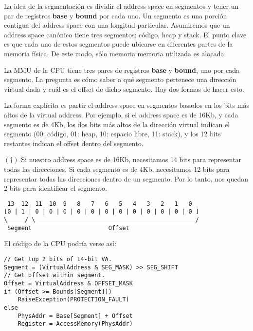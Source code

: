 \documentclass[12pt]{article}
\theoremstyle{definition}
\begin{document}
La idea de la segmentación es dividir el address space en segmentos y tener un
par de registros \textbf{base} y \textbf{bound} por cada uno. Un segmento es una
porción contigua del address space con una longitud particular. Asumiremos que
un address space canónico tiene tres segmentos: código, heap y stack.  El punto
clave es que cada uno de estos segmentos puede ubicarse en diferentes partes de
la memoria física.  De este modo, sólo memoria memoria utilizada es alocada. 

La MMU de la CPU tiene tres pares de registros \textbf{base} y \textbf{bound},
uno por cada segmento. La pregunta es cómo saber a qué segmento pertenece una
dirección virtual dada y cuál es el offset de dicho segmento. Hay dos formas de
hacer esto. 

La forma explícita es partir el address space en segmentos basados en los bits
más altos de la virtual address. Por ejemplo, si el address space es de 16Kb, y
cada segmento es de 4Kb, los dos bits más altos de la dirección virtual indican
el segmento (00: código, 01: heap, 10: espacio libre, 11: stack), y los 12 bits
restantes indican el offset dentro del segmento.

\begin{shaded}
$(\dagger)$ Si nuestro address space es de 16Kb, necesitamos 14 bits para
representar todas las direcciones. Si cada segmento es de 4Kb, necesitamos 12
bits para representar todas las direcciones dentro de un segmento. Por lo tanto,
nos quedan 2 bits para identificar el segmento.

\footnotesize
\begin{verbatim}
 13  12  11  10  9   8   7   6   5   4   3   2   1   0
[0 | 1 | 0 | 0 | 0 | 0 | 0 | 0 | 0 | 0 | 0 | 0 | 0 | 0 ]
\_____/ \______________________________________________/
 Segment                      Offset
\end{verbatim}
\normalsize

El código de la CPU podría verse así: 

\footnotesize
\begin{verbatim}
// Get top 2 bits of 14-bit VA.
Segment = (VirtualAddress & SEG_MASK) >> SEG_SHIFT 
// Get offset within segment.
Offset = VirtualAddress & OFFSET_MASK
if (Offset >= Bounds[Segment]))
    RaiseException(PROTECTION_FAULT)
else 
    PhysAddr = Base[Segment] + Offset 
    Register = AccessMemory(PhysAddr)
\end{verbatim}

\normalsize
\end{shaded}
\end{document}

